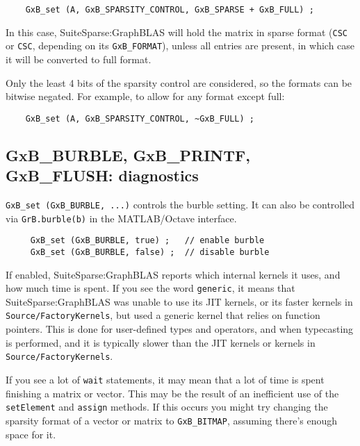\documentclass[12pt]{article}
\begin{document}
{\footnotesize
\begin{verbatim}
    GxB_set (A, GxB_SPARSITY_CONTROL, GxB_SPARSE + GxB_FULL) ; \end{verbatim}}

In this case, SuiteSparse:GraphBLAS will hold the matrix in sparse format
(\verb'CSC' or \verb'CSC', depending on its \verb'GxB_FORMAT'), unless all
entries are present, in which case it will be converted to full format.

Only the least 4 bits of the sparsity control are considered, so the
formats can be bitwise negated.  For example, to allow for any format
except full:

{\footnotesize
\begin{verbatim}
    GxB_set (A, GxB_SPARSITY_CONTROL, ~GxB_FULL) ; \end{verbatim}}

\subsection{{\sf GxB\_BURBLE}, {\sf GxB\_PRINTF}, {\sf GxB\_FLUSH}: diagnostics}

\verb'GxB_set (GxB_BURBLE, ...)' controls the burble setting.  It can also be
controlled via \verb'GrB.burble(b)' in the MATLAB/Octave interface.

{\footnotesize
\begin{verbatim}
     GxB_set (GxB_BURBLE, true) ;   // enable burble
     GxB_set (GxB_BURBLE, false) ;  // disable burble \end{verbatim}}

If enabled, SuiteSparse:GraphBLAS reports which internal kernels it uses, and
how much time is spent.  If you see the word \verb'generic', it means that
SuiteSparse:GraphBLAS was unable to use its JIT kernels, or its faster kernels
in \verb'Source/FactoryKernels', but used a generic kernel that relies on
function pointers.  This is done for user-defined types and operators, and when
typecasting is performed, and it is typically slower than the JIT kernels
or kernels in \verb'Source/FactoryKernels'.

If you see a lot of \verb'wait' statements, it may mean that a lot of time is
spent finishing a matrix or vector.  This may be the result of an inefficient
use of the \verb'setElement' and \verb'assign' methods.  If this occurs you
might try changing the sparsity format of a vector or matrix to
\verb'GxB_BITMAP', assuming there's enough space for it.
\end{document}
